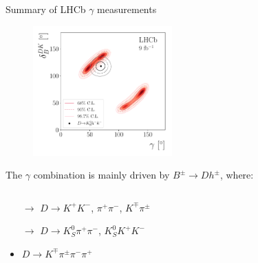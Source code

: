 \documentclass[xcolor={dvipsnames}]{beamer}
\begin{document}
\begin{frame}{Summary of LHCb \texorpdfstring{$\gamma$}{gamma} measurements}
  \begin{figure}
    \includegraphics[height=5cm]{Plots/Fig6a_two_body.pdf}
  \end{figure}
  \vspace{-0.8cm}
  \begin{center}
    The $\gamma$ combination is mainly driven by $B^\pm\to Dh^\pm$, where:
  \end{center}
  \vspace{-0.2cm}
  \begin{columns}
    \begin{column}{0.5\textwidth}
      \begin{itemize}
        \setlength\itemsep{0.5em}
        \item[$\rightarrow$]{$D\to K^+K^-$, $\pi^+\pi^-$, $K^\mp\pi^\pm$}
        \item[$\rightarrow$]{$D\to K_S^0\pi^+\pi^-$, $K_S^0K^+K^-$}
        \item{$D\to K^\mp\pi^\pm\pi^-\pi^+$}
      \end{itemize}
    \end{column}
    \begin{column}{0.5\textwidth}
      \begin{itemize}
        \item[]{}
      \end{itemize}
    \end{column}
  \end{columns}
\end{frame}
\end{document}

